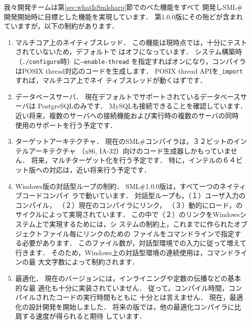 \documentclass{jbook}
\newcommand{\smlsharp}{SML\#}
\newcommand{\version}{1.0.0}
\begin{document}
\ifx\jp%
	我々開発チームは第\ref{sec:whatIsSmlsharp}節でのべた機能をすべて
開発し\smlsharp{}開発開始時に目標とした機能を実現しています．
	第\version{}版にその殆どが含まれていますが，以下の制約があります．
\begin{enumerate}
\item マルチコア上のネイティブスレッド．
	この機能は現時点では，十分にテストされていないため，デフォルトで
はオフになっています．
	システム構築時（{\tt ./configure}時）に{\tt --enable-thread}
を指定すればオンになり，コンパイラはPOSIX thread対応のコードを生成します．
	POSIX thread APIを{\tt \_import}すれば，マルチコア上でネイ
ティブスレッドが動くはずです．

\item データベースサーバ．
	現在デフォルトでサポートされているデータベースサーバは
PostgreSQLのみです．
	MySQLも接続できることを確認しています．
	近い将来，複数のサーバへの接続機能および実行時の複数のサーバの同時
使用のサポートを行う予定です．

\item ターゲットアーキテクチャ．
	現在の\smlsharp{}コンパイラは，３２ビットのインテルアーキテクチャ
（x86, IA-32）向けのコード生成器しかもっていません．
	将来，マルチターゲット化を行う予定です．
	特に，インテルの６４ビット版への対応は，近い将来行う予定です．

\item Windows版の対話型ループの制約．
	\smlsharp{}\version{}版は，すべて一つのネイティブコードコンパイ
ラで動いています．
	対話型ループも，（１）ユーザ入力のコンパイル，
（２）現在のコンパイラにリンク，
（３）動的にロード，のサイクルによって実現されています．
	この中で（２）のリンクをWindowsシステム上で実現するためには，シ
ステムの制約上，これまでに作られたオブジェクトファイル毎にリンクのための
ファイルをコマンドラインで指定する必要があります．
	このファイル数が，対話型環境での入力に従って増えて行きます．
	そのため，Windows上の対話型環境の連続使用は，コマンドラインの最
大文字数によって制約されます．

\item 最適化．
	現在のバージョンには，インライニングや定数の伝播などの基本的な最
適化も十分に実装されていません．
	従って，コンパイル時間，コンパイルされたコードの実行時間もともに
十分とは言えません．
	現在，最適化の設計開発を開始しました．
	将来の版では，他の最適化コンパイラに比肩する速度が得られると期待
しています．
\end{enumerate}
\else%
\end{document}
